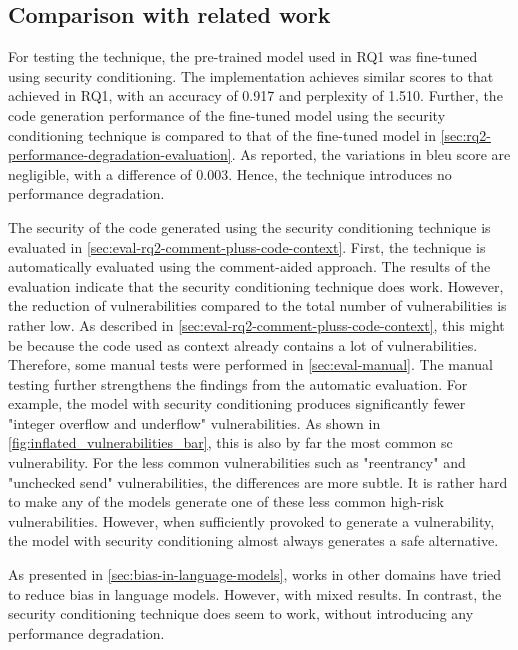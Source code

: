 \subsection{Comparison with related work}
\label{sec:rq2-comparison-with-related-work}
For testing the technique, the pre-trained model used in RQ1 was fine-tuned using security conditioning. The implementation achieves similar scores to that achieved in RQ1, with an accuracy of 0.917 and perplexity of 1.510. Further, the code generation performance of the fine-tuned model using the security conditioning technique is compared to that of the fine-tuned model in \cref{sec:rq2-performance-degradation-evaluation}. As reported, the variations in \acrshort{bleu} score are negligible, with a difference of 0.003. Hence, the technique introduces no performance degradation. 

The security of the code generated using the security conditioning technique is evaluated in \cref{sec:eval-rq2-comment-pluss-code-context}. First, the technique is automatically evaluated using the comment-aided approach. The results of the evaluation indicate that the security conditioning technique does work. However, the reduction of vulnerabilities compared to the total number of vulnerabilities is rather low. As described in \cref{sec:eval-rq2-comment-pluss-code-context}, this might be because the code used as context already contains a lot of vulnerabilities. Therefore, some manual tests were performed in \cref{sec:eval-manual}. The manual testing further strengthens the findings from the automatic evaluation. For example, the model with security conditioning produces significantly fewer "integer overflow and underflow" vulnerabilities. As shown in \cref{fig:inflated_vulnerabilities_bar}, this is also by far the most common \acrshort{sc} vulnerability. For the less common vulnerabilities such as "reentrancy" and "unchecked send" vulnerabilities, the differences are more subtle. It is rather hard to make any of the models generate one of these less common high-risk vulnerabilities. However, when sufficiently provoked to generate a vulnerability, the model with security conditioning almost always generates a safe alternative.

As presented in \cref{sec:bias-in-language-models}, works in other domains have tried to reduce bias in language models. However, with mixed results. In contrast, the security conditioning technique does seem to work, without introducing any performance degradation.  

